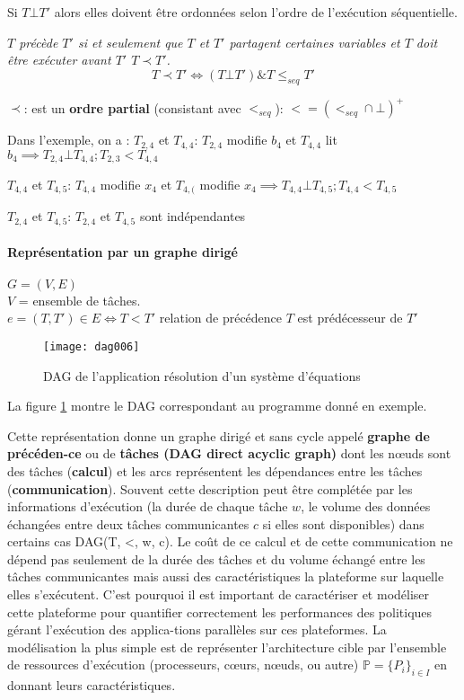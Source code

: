 Si $T \bot T'$ alors elles doivent être ordonnées selon l'ordre de l'exécution séquentielle.
%
\begin{définition}\textit{
%
$T$ précède $T'$ si et seulement que $T$ et $T'$ partagent certaines variables et $T$ doit être exécuter avant $T'$ $T \prec T'$.
%
$$
T \prec T' \iff (T \bot T') \& T \leq_{seq} T'
$$
%
}\end{définition}
$\prec$: est un \textbf{ordre partial} (consistant avec $<_{seq}$): $< = (<_{seq} \cap \bot)^+$

Dans l'exemple, on a : 
$T_{2,4}$ et $T_{4,4}$: $T_{2,4}$ modifie $b_4$ et $T_{4,4}$ lit $b_4 \implies T_{2,4} \bot T_{4,4}; T_{2,3} < T_{4,4}$

$T_{4,4}$ et $T_{4,5}$: $T_{4,4}$ modifie $x_4$ et $T_{4,(}$ modifie $x_4 \implies T_{4,4} \bot T_{4,5}; T_{4,4} < T_{4,5}$

$T_{2,4}$ et $T_{4,5}$: $T_{2,4}$ et $T_{4,5}$ sont indépendantes 

\paragraph{Représentation par un graphe dirigé}
$G = (V,E)$\\
$V$ = ensemble de tâches.\\
$e=(T,T') \in E \iff T < T'$ relation de précédence $T$ est prédécesseur de $T'$
%
\begin{figure}  %
\texttt{[image: dag006]}
\centering
\caption{DAG de l'application résolution d'un système d'équations \cite{Dreb15}}
\label{fig:FG_3_2}
\end{figure} 
%
La figure \ref{fig:FG_3_2} montre le DAG correspondant au programme donné en exemple. 

Cette représentation donne un graphe dirigé et sans cycle appelé \textbf{graphe de précéden-ce} ou de \textbf{tâches  (DAG direct acyclic graph)} dont les nœuds sont des tâches (\textbf{calcul}) et les arcs représentent les dépendances entre les tâches (\textbf{communication}). 
Souvent cette description peut être complétée par les informations d'exécution (la durée de chaque tâche $w$, le volume des données échangées entre deux tâches communicantes $c$ si elles sont disponibles) dans certains cas DAG(T, <, w, c). 
Le coût de ce calcul et de cette communication ne dépend pas seulement de la durée des tâches et du volume échangé entre les tâches communicantes mais aussi des caractéristiques la plateforme sur laquelle elles s'exécutent.
C'est pourquoi il est important de caractériser et modéliser cette plateforme pour quantifier correctement les performances des politiques gérant l'exécution des applica-tions parallèles sur ces plateformes. La modélisation la plus simple est de représenter l'architecture cible par l'ensemble de ressources d'exécution (processeurs, cœurs, nœuds, ou autre) $\mathbb{P} = \{P_i\}_{i \in I}$ en donnant leurs caractéristiques.

